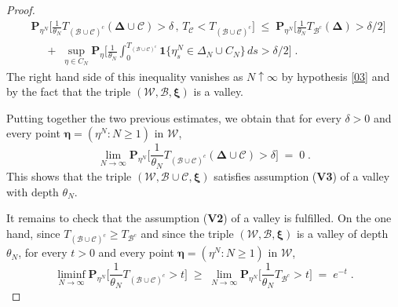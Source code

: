 \documentclass[reqno]{amsart}
\begin{document}
\begin{proof}
\begin{equation*}
\begin{split}
& {{\mathbf P}}_{\eta^N} \Big[ \frac 1{\theta_N} 
T_{({{\mathscr B}} \cup {{\mathscr C}})^c} ({{\boldsymbol \Delta}} \cup {{\mathscr C}}) > \delta 
\, , \, T_{{{\mathscr C}}} < T_{({{\mathscr B}} \cup {{\mathscr C}})^{c}}  \Big]  
\;\le\; {{\mathbf P}}_{\eta^N} \Big[ \frac 1{\theta_N} 
T_{{{\mathscr B}}^c} ({{\boldsymbol \Delta}}) > \delta/2 \Big] \\
&\quad  
\;+\; \sup_{\eta\in C_N} {{\mathbf P}}_{\eta} \Big[ \frac 1{\theta_N} 
\int_{0} ^{T_{({{\mathscr B}} \cup {{\mathscr C}})^c}} 
{{\mathbf 1}}\{ \eta^N_s \in \Delta_N \cup C_N\} \, ds > \delta/2 \Big]\; .
\end{split}
\end{equation*}
The right hand side of this inequality vanishes as $N\uparrow\infty$
by hypothesis \eqref{03} and by the fact that the triple $({{\mathscr W}}, {{\mathscr B}}, {{\boldsymbol \xi}})$ is a valley.

Putting together the two previous estimates, we obtain that for every
$\delta>0$ and every point ${{\boldsymbol \eta}} = (\eta^N : N\ge 1)$ in ${{\mathscr W}}$,
\begin{equation*}
\lim_{N\to\infty} {{\mathbf P}}_{\eta^N} \Big[ \frac 1{\theta_N} 
T_{({{\mathscr B}} \cup {{\mathscr C}})^c} ({{\boldsymbol \Delta}} \cup {{\mathscr C}}) > \delta \Big]\;=\;
0\; .
\end{equation*}
This shows that the triple $({{\mathscr W}}, {{\mathscr B}} \cup {{\mathscr C}}, {{\boldsymbol \xi}})$
satisfies assumption ({\bf V3}) of a valley with depth $\theta_N$.

It remains to check that the assumption ({\bf V2}) of a valley is
fulfilled. On the one hand, since $T_{({{\mathscr B}} \cup {{\mathscr C}})^c} \ge T_{{{\mathscr B}}^c}$ and since the triple $({{\mathscr W}}, {{\mathscr B}} , {{\boldsymbol \xi}})$ is a valley of
depth $\theta_N$, for every $t>0$ and every point ${{\boldsymbol \eta}} = (\eta^N
: N\ge 1)$ in ${{\mathscr W}}$,
\begin{equation}
\label{04}
\liminf_{N\to\infty} {{\mathbf P}}_{\eta^N} \Big[ \frac 1{\theta_N} 
T_{({{\mathscr B}} \cup {{\mathscr C}})^c} > t \Big] \;\ge\;
\lim_{N\to\infty} {{\mathbf P}}_{\eta^N} \Big[ \frac 1{\theta_N} 
T_{{{\mathscr B}}^c} > t \Big] \;=\; e^{-t}\; .
\end{equation}


\end{proof}
\end{document}
